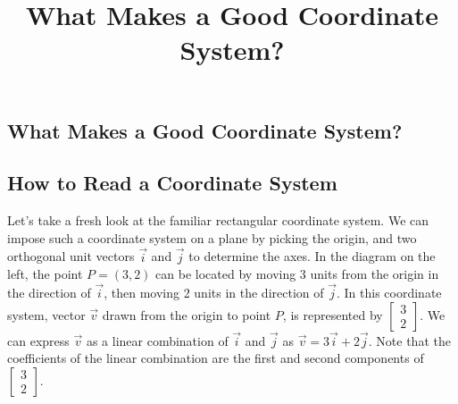 \documentclass{ximera}
\title{What Makes a Good Coordinate System?} \license{CC BY-NC-SA 4.0}
\begin{document}
\begin{abstract}
\end{abstract}
\maketitle

\begin{onlineOnly}
\section*{What Makes a Good Coordinate System?}
\end{onlineOnly}

\subsection*{How to Read a Coordinate System}
Let's take a fresh look at the familiar rectangular coordinate system.  We can impose such a coordinate system on a plane by picking the origin, and two orthogonal unit vectors $\vec{i}$ and $\vec{j}$ to determine the axes.  In the diagram on the left, the point $P=(3,2)$ can be located by moving 3 units from the origin in the direction of $\vec{i}$, then moving 2 units in the direction of $\vec{j}$. In this coordinate system, vector $\vec{v}$ drawn from the origin to point $P$, is represented by $\begin{bmatrix}3\\2\end{bmatrix}$.  We can express $\vec{v}$ as a linear combination of $\vec{i}$ and $\vec{j}$ as $\vec{v}=3\vec{i}+2\vec{j}$.  Note that the coefficients of the linear combination are the first and second components of $\begin{bmatrix}3\\2\end{bmatrix}$.
\end{document}
